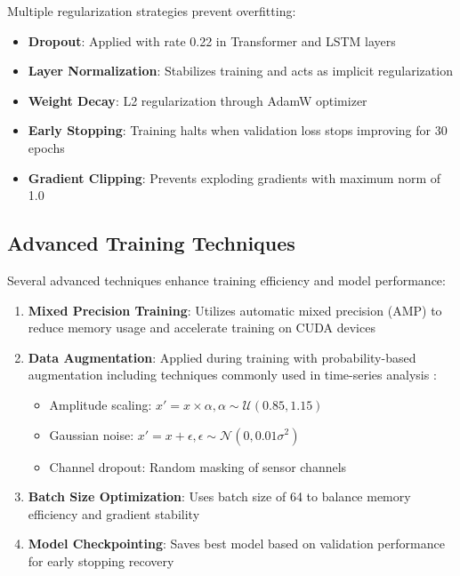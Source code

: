 Multiple regularization strategies prevent overfitting:

\begin{itemize}
    \item \textbf{Dropout}: Applied with rate 0.22 in Transformer and LSTM layers
    \item \textbf{Layer Normalization}: Stabilizes training and acts as implicit regularization
    \item \textbf{Weight Decay}: L2 regularization through AdamW optimizer
    \item \textbf{Early Stopping}: Training halts when validation loss stops improving for 30 epochs
    \item \textbf{Gradient Clipping}: Prevents exploding gradients with maximum norm of 1.0
\end{itemize}

\subsection{Advanced Training Techniques}
\label{subsec:advanced_training}

Several advanced techniques enhance training efficiency and model performance:

\begin{enumerate}
    \item \textbf{Mixed Precision Training}: Utilizes automatic mixed precision (AMP) to reduce memory usage and accelerate training on CUDA devices
    
    \item \textbf{Data Augmentation}: Applied during training with probability-based augmentation including techniques commonly used in time-series analysis \citep{wen2021time}:
    \begin{itemize}
        \item Amplitude scaling: $x' = x \times \alpha, \alpha \sim \mathcal{U}(0.85, 1.15)$
        \item Gaussian noise: $x' = x + \epsilon, \epsilon \sim \mathcal{N}(0, 0.01\sigma^2)$
        \item Channel dropout: Random masking of sensor channels
    \end{itemize}
    
    \item \textbf{Batch Size Optimization}: Uses batch size of 64 to balance memory efficiency and gradient stability
    
    \item \textbf{Model Checkpointing}: Saves best model based on validation performance for early stopping recovery
\end{enumerate}

